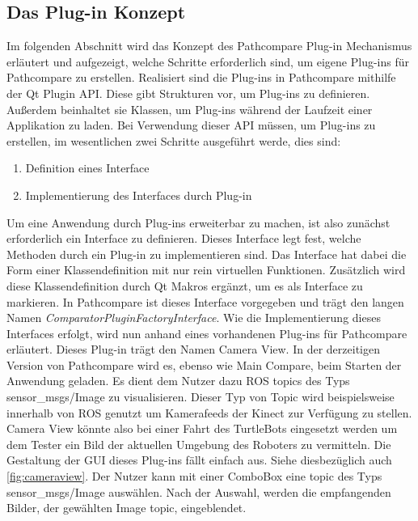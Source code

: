 \subsection{Das Plug-in Konzept}
Im folgenden Abschnitt wird das Konzept des Pathcompare Plug-in Mechanismus
erläutert und aufgezeigt, welche Schritte erforderlich sind, um eigene Plug-ins
für Pathcompare zu erstellen. Realisiert sind die Plug-ins in Pathcompare
mithilfe der Qt Plugin API. Diese gibt Strukturen vor, um Plug-ins zu
definieren. Außerdem beinhaltet sie Klassen, um Plug-ins während der Laufzeit
einer Applikation zu laden.  Bei Verwendung dieser API müssen, um Plug-ins zu
erstellen, im wesentlichen zwei Schritte ausgeführt werde, dies sind:

\begin{enumerate}
  \item Definition eines Interface
  \item Implementierung des Interfaces durch Plug-in
\end{enumerate}

Um eine Anwendung durch Plug-ins erweiterbar zu machen, ist also zunächst
erforderlich ein Interface zu definieren. Dieses Interface legt fest, welche
Methoden durch ein Plug-in zu implementieren sind. Das Interface hat dabei die
Form einer Klassendefinition mit nur rein virtuellen Funktionen. Zusätzlich
wird diese Klassendefinition durch Qt Makros ergänzt, um es als Interface zu
markieren. In Pathcompare ist dieses Interface vorgegeben und trägt den langen
Namen \textit{ComparatorPluginFactoryInterface}. Wie die Implementierung dieses
Interfaces erfolgt, wird nun anhand eines vorhandenen Plug-ins für Pathcompare
erläutert.  Dieses Plug-in trägt den Namen Camera View. In der derzeitigen
Version von Pathcompare wird es, ebenso wie Main Compare, beim Starten der
Anwendung geladen.  Es dient dem Nutzer dazu ROS topics des Typs
sensor\_msgs/Image zu visualisieren. Dieser Typ von Topic wird beispielsweise
innerhalb von ROS genutzt um Kamerafeeds der Kinect zur Verfügung zu stellen.
Camera View könnte also bei einer Fahrt des TurtleBots eingesetzt werden um dem
Tester ein Bild der aktuellen Umgebung des Roboters zu vermitteln. Die
Gestaltung der GUI dieses Plug-ins fällt einfach aus. Siehe diesbezüglich auch
\autoref{fig:cameraview}. Der Nutzer kann mit einer
ComboBox eine topic des Typs sensor\_msgs/Image auswählen. Nach der Auswahl, werden die empfangenden
Bilder, der gewählten Image topic, eingeblendet. 

